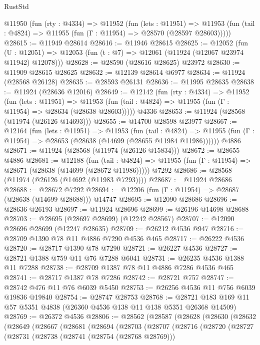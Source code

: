 \begin{lexlean}{RustStd}
\begin{coremodule}
{\begin{coremodule}
{{{{{{{{{{{{{{{{{{{{{{{{{{{{{{{{{{{{{{{{{{{{{{{{{{{{{{{{{{{{{{{{{{{{{{{{{{{{{{{{  @11950
    (fun (rty : @4334) =>
    @11952
      (fun (lets : @11951) =>
      @11953 (fun (tail : @4824) => @11955 (fun (Γ : @11954) => @28570 (@28597 @28603)))))
@28615 := @11949 @28614
@28616 := @11946 @28615
@28625 := @12052
    (fun (U : @12051) => @12053 (fun (t : @7) => @12061 (@11924 (@12067 @23974 @11942) @12078)))
@28628 := @28590 (@28616 @28625) @23972
@28630 := @11909 @28615 @28625
@28632 := @12139 @28614 @6977
@28634 := @11924 (@28568 @26128)
@28635 := @28593 @26131
@28636 := @11995 @28635
@28638 := @11924 (@28636 @12016)
@28649 := @12142
    (fun (rty : @4334) =>
    @11952
      (fun (lets : @11951) =>
      @11953 (fun (tail : @4824) => @11955 (fun (Γ : @11954) => @28634 (@28638 @28603)))))
    @4336
@28653 := @11924 (@28568 (@11974 (@26126 @14693)))
@28655 := @14700 @28598 @23977
@28667 := @12164
    (fun (lets : @11951) =>
    @11953
      (fun (tail : @4824) =>
      @11955 (fun (Γ : @11954) => @28653 (@28638 (@14699 (@28655 @11984 @11986))))))
    @4886
@28671 := @11924 (@28568 (@11974 (@26126 @15834)))
@28672 := @28655 @4886
@28681 := @12188
    (fun (tail : @4824) => @11955 (fun (Γ : @11954) => @28671 (@28638 (@14699 (@28672 @11986)))))
    @7292
@28686 := @28568 (@11974 (@26126 (@14692 (@11983 @7293))))
@28687 := @11924 @28686
@28688 := @28672 @7292
@28694 := @12206 (fun (Γ : @11954) => @28687 (@28638 (@14699 @28688))) @14747
@28695 := @12090 @28686
@28696 := @28636 @26193
@28697 := @11924 @28696
@28699 := @26196 @14698 @28688
@28703 := @28695 (@28697 @28699) (@12242 @28567)
@28707 := @12090 @28696 @28699 (@12247 @28635)
@28709 := @26212 @4536 @947
@28716 := @28709 @1390 @78 @11 @4886 @7290 @4536 @465
@28717 := @26222 @4536
@28720 := @28717 @1390 @78 @7290
@28721 := @26227 @4536
@28727 := @28721 @1388 @759 @11 @76 @7288 @6041
@28731 := @26235 @4536 @1388 @11 @7288
@28738 := @28709 @1387 @78 @11 @4886 @7286 @4536 @465
@28741 := @28717 @1387 @78 @7286
@28742 := @28721 @757
@28747 := @28742 @476 @11 @76 @6039 @5450
@28753 := @26256 @4536 @11 @756 @6039 @19836 @19840
@28754 := @28747 @28753
@28768 := @28721 @183 @169 @11 @57 @5351 @4838 (@26360 @4536 @138 @11 @138 @5351 @26368 @14509)
@28769 := @26372 @4536
@28806 := @28562
    (@28587
      (@28628
        (@28630
          (@28632
            (@28649
              (@28667
                (@28681
                  (@28694
                    (@28703
                      (@28707
                        (@28716
                          (@28720
                            (@28727
                              (@28731
                                (@28738
                                  (@28741 (@28754 (@28768 @28769)))
}}}}}}}}}}}}}}}}}}}}}}}}}}}}}}}}}}}}}}}}}}}}}}}}}}}}}}}}}}}}}}}}}}}}}}}}}}}}}}}}
\end{coremodule}}
\end{coremodule}
\end{lexlean}
